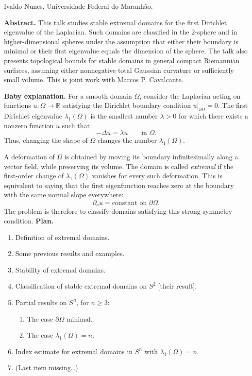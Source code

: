 \medskip\noindent
Ivaldo Nunes,
Universidade Federal do Maranh\~ao.

\medskip\noindent
{\bf Abstract.}
This talk studies stable extremal domains
for the first Dirichlet eigenvalue of the
Laplacian. Such domains are classified in
the $2$-sphere and in higher-dimensional
spheres under the assumption that either
their boundary is minimal or their first
eigenvalue equals the dimension of the
sphere. The talk also presents topological
bounds for stable domains in general
compact Riemannian surfaces, assuming
either nonnegative total Gaussian
curvature or sufficiently small volume.
This is joint work with
Marcos P. Cavalcante.

\medskip\noindent
{\bf Baby explanation.}
For a smooth domain $\Omega$, consider
the Laplacian acting on functions
$u:\Omega\to\mathbb{R}$ satisfying the
Dirichlet boundary condition
$u|_{\partial\Omega}=0$. The first
Dirichlet eigenvalue $\lambda_1(\Omega)$
is the smallest number $\lambda>0$ for
which there exists a nonzero function $u$
such that
\[
-\Delta u=\lambda u
\qquad\text{in }\Omega.
\]
Thus, changing the shape of $\Omega$
changes the number $\lambda_1(\Omega)$.

A deformation of $\Omega$ is obtained by
moving its boundary infinitesimally along
a vector field, while preserving its
volume. The domain is called
{\it extremal} if the first-order change
of $\lambda_1(\Omega)$ vanishes for every
such deformation. This is equivalent to
saying that the first eigenfunction
reaches zero at the boundary with the
same normal slope everywhere:
\[
\partial_\nu u
=
\text{constant on }\partial\Omega.
\]
The problem is therefore to classify
domains satisfying this strong symmetry
condition.
\medskip\noindent
{\bf Plan.}
\begin{enumerate}
\item Definition of extremal domains.
\item Some previous results and examples.
\item Stability of extremal domains.
\item Classification of stable extremal
domains on $S^2$ [their result].
\item Partial results on $S^n$,
for $n \geq 3$:
\begin{enumerate}
\item The case $\partial \Omega$ minimal.
\item The case $\lambda_1 (\Omega)=n$.
\end{enumerate}
\item Index estimate for extremal domains
in $S^n$ with $\lambda_1(\Omega)=n.$
\item (Last item missing…)
\end{enumerate}

